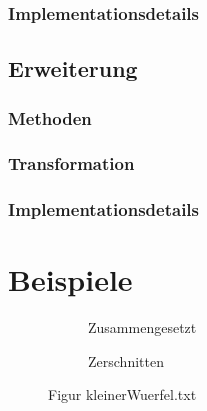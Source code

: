 \documentclass[a4paper,10pt,ngerman]{scrartcl}
\newcommand{\simplecube}[8]%
{
    \begin{scope}[shift={#1}]
        \fill[gray!40,canvas is yz plane at x=#2, opacity=#8] (0,0) rectangle (#3,#4);
        \fill[gray!10,canvas is xz plane at y=#3, opacity=#8] (0,0) rectangle (#2,#4);
        \fill[white  ,canvas is xy plane at z=#4, opacity=#8] (0,0) rectangle (#2,#3);
        \foreach\i/\j in {0/1, 1/1, 1/0}
            {
            \draw[line#5] (0,#3*\i,#4*\j) --++ (#2,0,0);
            \draw[line#6] (#2*\i,0,#4*\j) --++ (0,#3,0);
            \draw[line#7] (#2*\i,#3*\j,0) --++ (0,0,#4);
        }
    \end{scope}
}
\newcommand{\smallSquare}[4]%
{
    \begin{scope}[shift={#1}]
        \simplecube{(0,     0,      0)}     {1}{2}{2}   {a}{a}{a}   {1}
        \simplecube{(1+#4,   0,      0))}    {1}{2}{2}   {a}{a}{a}   {1}
    \end{scope}
}
\begin{document}
    \subsubsection{Implementationsdetails}\label{subsubsec:implementationsdetails}

    \subsection{Erweiterung}\label{subsec:erweiterung2}

    \subsubsection{Methoden}\label{subsubsec:methoden_erweiterung}
    \subsubsection{Transformation}\label{subsubsec:transformation_erweiterung}
    \subsubsection{Implementationsdetails}\label{subsubsec:implementationsdetails_erweiterung}

    \newpage


    \section{Beispiele}\label{sec:beispiele}

    \begin{figure}[H]
        \centering
        \def\a{3.2}
        \def\b{1.2}
        \begin{subfigure}[b]{0.45\textwidth}
            \centering %
            \caption{Zusammengesetzt}\label{fig:figA2}
        \end{subfigure}
        \begin{subfigure}[b]{0.45\textwidth}
            \centering %
            \caption{Zerschnitten}\label{fig:figB2}
        \end{subfigure}
        \caption{Figur kleinerWuerfel.txt}\label{fig:figAB2}
    \end{figure}
\end{document}

